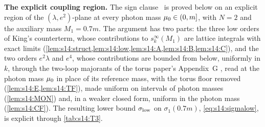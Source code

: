 \medskip\noindent\textbf{The explicit coupling region.} The sign clause \Tthree\ is proved below on an explicit region of the $(\lambda,e^2)$-plane at every photon mass $\mu_0\in(0,m]$, with $N=2$ and the auxiliary mass $M_1=0.7m$. The argument has two parts: the three low orders of King's counterterm, whose contributions to $s^\infty_k(M_1)$ are lattice integrals with exact limits (\cref{lem:s14:struct,lem:s14:low,lem:s14:A,lem:s14:B,lem:s14:C}), and the two orders $e^2\lambda$ and $e^4$, whose contributions are bounded from below, uniformly in $k$, through the two-loop majorants of the torus paper's Appendix~G \cite{SymPhase}, read at the photon mass $\mu_0$ in place of its reference mass, with the torus floor removed (\cref{lem:s14:E,lem:s14:TF}), made uniform on intervals of photon masses (\cref{lem:s14:MON}) and, in a weaker closed form, uniform in the photon mass (\cref{lem:s14:CF}). The resulting lower bound $\sigma_{\rm low}$ on $\sigma_1(0.7m)$, \eqref{eq:s14:sigmalow}, is explicit through \cref{tab:s14:T3}.







